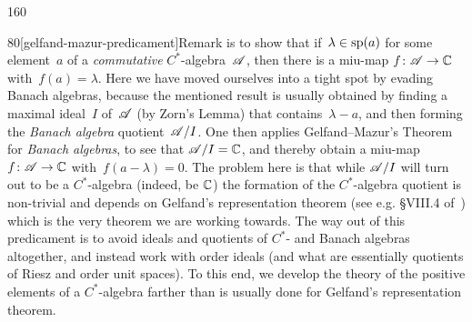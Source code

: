 \begin{parsec}{160}
\begin{point}{80}[gelfand-mazur-predicament]{Remark}
is to show that if~$\lambda\in\mathrm{sp}(a)$
for some element~$a$ of a \emph{commutative} $C^*$-algebra~$\mathscr{A}$,
then there is a miu-map $f\colon \mathscr{A}\to \mathbb{C}$
with~$f(a)=\lambda$.
Here we have moved ourselves into a tight spot
by evading Banach algebras,
because the mentioned result is usually obtained
by finding a maximal ideal~$I$ of~$\mathscr{A}$
(by Zorn's Lemma) that contains~$\lambda-a$,
and then forming the \emph{Banach algebra} quotient~$\mathscr{A}/I$.
One then applies Gelfand--Mazur's Theorem for \emph{Banach algebras}, 
to see that
$\mathscr{A}/I= \mathbb{C}$,
and thereby obtain a miu-map~$f\colon \mathscr{A}\to \mathbb{C}$ with~$f(a-\lambda)=0$.
The problem here is that while $\mathscr{A}/I$
will turn out to be a $C^*$-algebra (indeed, be $\mathbb{C}$)
the formation of the $C^*$-algebra quotient
is non-trivial and depends on Gelfand's representation theorem
(see e.g. \S{}VIII.4 of~\cite{conway2013}) 
which is the very theorem we are working towards.
The way out of this predicament
is to avoid ideals and quotients of $C^*$- and Banach algebras
altogether,
and instead work 
with order ideals (and what are essentially
 quotients of Riesz and order unit spaces).
To this end,
we develop the theory
of the positive elements of a $C^*$-algebra
farther than is usually done
for Gelfand's representation theorem.
\end{point}
\end{parsec}
